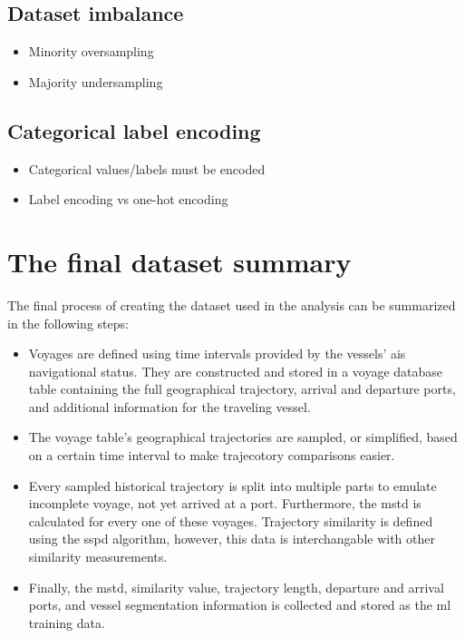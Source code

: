 \subsection{Dataset imbalance}

\begin{itemize}
    \item Minority oversampling
    \item Majority undersampling
\end{itemize}

\subsection{Categorical label encoding}

\begin{itemize}
    \item Categorical values/labels must be encoded
    \item Label encoding vs one-hot encoding
\end{itemize}

\section{The final dataset summary}

The final process of creating the dataset used in the analysis can be summarized in the following steps:

\begin{itemize}
    \item Voyages are defined using time intervals provided by the vessels' \acrshort{ais} navigational status. They are constructed and stored in a voyage database table containing the full geographical trajectory, arrival and departure ports, and additional information for the traveling vessel.
    \item The voyage table's geographical trajectories are sampled, or simplified, based on a certain time interval to make trajecotory comparisons easier.
    \item Every sampled historical trajectory is split into multiple parts to emulate incomplete voyage, not yet arrived at a port. Furthermore, the \acrshort{mstd} is calculated for every one of these voyages. Trajectory similarity is defined using the \acrshort{sspd} algorithm, however, this data is interchangable with other similarity measurements.
    \item Finally, the \acrshort{mstd}, similarity value, trajectory length, departure and arrival ports, and vessel segmentation information is collected and stored as the \acrshort{ml} training data.
\end{itemize}

